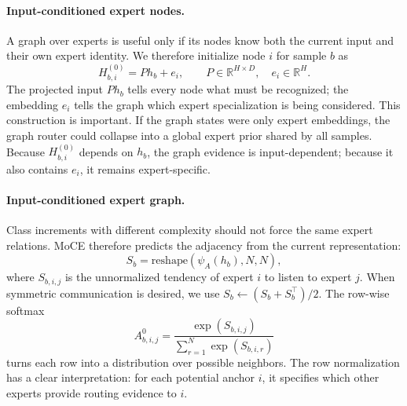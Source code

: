 \documentclass{article}
\theoremstyle{definition}
\theoremstyle{remark}
\begin{document}
\paragraph{Input-conditioned expert nodes.}
A graph over experts is useful only if its nodes know both the current input and their own expert identity. We therefore initialize node $i$ for sample $b$ as
\begin{equation}
    H^{(0)}_{b,i}=P h_b+e_i,
    \qquad P\in\mathbb{R}^{H\times D},\quad e_i\in\mathbb{R}^{H}.
    \label{eq:node_init}
\end{equation}
The projected input $Ph_b$ tells every node what must be recognized; the embedding $e_i$ tells the graph which expert specialization is being considered. This construction is important. If the graph states were only expert embeddings, the graph router could collapse into a global expert prior shared by all samples. Because $H^{(0)}_{b,i}$ depends on $h_b$, the graph evidence is input-dependent; because it also contains $e_i$, it remains expert-specific.

\paragraph{Input-conditioned expert graph.}
Class increments with different complexity should not force the same expert relations. MoCE therefore predicts the adjacency from the current representation:
\begin{equation}
    S_b=\mathrm{reshape}(\psi_A(h_b),N,N),
    \label{eq:adj_logits_raw}
\end{equation}
where $S_{b,i,j}$ is the unnormalized tendency of expert $i$ to listen to expert $j$. When symmetric communication is desired, we use $S_b\leftarrow(S_b+S_b^\top)/2$. The row-wise softmax
\begin{equation}
    A^{0}_{b,i,j}=\frac{\exp(S_{b,i,j})}{\sum_{r=1}^{N}\exp(S_{b,i,r})}
    \label{eq:row_softmax_adj}
\end{equation}
turns each row into a distribution over possible neighbors. The row normalization has a clear interpretation: for each potential anchor $i$, it specifies which other experts provide routing evidence to $i$.
\end{document}

